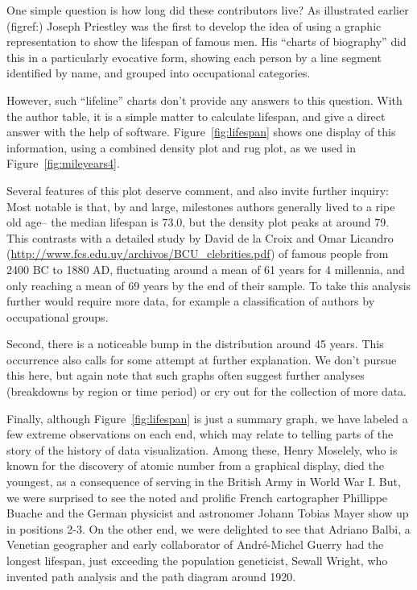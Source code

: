 \documentclass[11pt]{article}
\newcommand*{\figref}[1]{Figure~\ref{#1}}
\begin{document}
One simple question is how long did these contributors live? As illustrated earlier (figref:)
Joseph Priestley was the first to develop the idea of using a graphic representation to show
the lifespan of famous men. His ``charts of biography'' did this in a particularly evocative
form, showing each person by a line segment identified by name, and grouped into
occupational categories.

However, such ``lifeline'' charts don't provide any answers to this question.  With the
author table, it is a simple matter to calculate lifespan, and give a direct answer
with the help of software.  \figref{fig:lifespan} shows one display of this information,
using a combined density plot and rug plot, as we used in \figref{fig:mileyears4}.

Several features of this plot deserve comment, and also invite further inquiry:
Most notable is that, by and large, milestones authors generally lived to a ripe old age--
the median lifespan is 73.0, but the density plot peaks at around 79.
This contrasts with a detailed study by
David de la Croix and Omar Licandro (\url{http://www.fcs.edu.uy/archivos/BCU_clebrities.pdf})
of famous people from 2400 BC to 1880 AD,
fluctuating around a mean of 61 years for 4 millennia, and only reaching a mean of 69 years
by the end of their sample. To take this analysis further would require more data, for example
a classification of authors by occupational groups.

Second, there is a noticeable bump in the distribution around 45 years. This
occurrence also calls for some attempt at further explanation.
We don't pursue this here, but again note that such graphs often suggest
further analyses (breakdowns by region or time period)
or cry out for the collection of more data.

Finally, although \figref{fig:lifespan} is just a summary graph, we have labeled a few
extreme observations on each end, which may relate to telling parts of the story of the
history of data visualization.  Among these, Henry Moselely, who is known for the
discovery of atomic number from a graphical display, died the youngest, as a consequence
of serving in the British Army in World War I. But, we were surprised to see
the noted and prolific French cartographer Phillippe Buache
and the German physicist and astronomer Johann Tobias Mayer show up in positions
2-3.  On the other end, we were delighted to see that Adriano Balbi,
a Venetian geographer and early collaborator of Andr{\'e}-Michel Guerry
\citep{BalbiGuerry:1829} had the longest lifespan,
just exceeding the population geneticist, Sewall Wright, who invented
path analysis and the path diagram around 1920.
\end{document}
